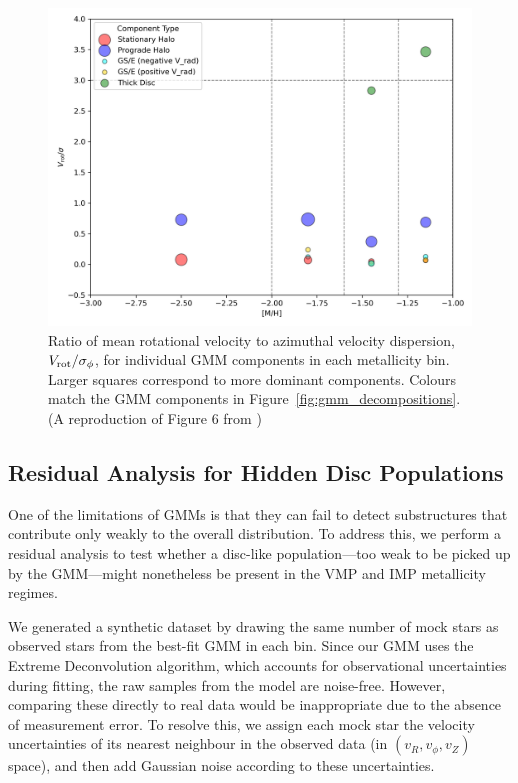 \documentclass[a4paper,12pt]{article}
\begin{document}
\begin{figure}[h]
    \centering
    \includegraphics[width=\linewidth]{../figures/v_over_sigma_per_component.png}
    \caption{Ratio of mean rotational velocity to azimuthal velocity dispersion, 
    $V_{\rm rot} / \sigma_\phi$, for individual GMM components in each metallicity bin. 
    Larger squares correspond to more dominant components. Colours match the GMM components 
    in Figure~\ref{fig:gmm_decompositions}.(A reproduction of Figure 6 from \citet{zhang2024existencemetalpoordiscmilky})}
    \label{fig:v_over_sigma}
\end{figure}

\subsection{Residual Analysis for Hidden Disc Populations}

One of the limitations of GMMs is that they can fail to detect substructures that contribute 
only weakly to the overall distribution. To address this, we perform a residual analysis to test 
whether a disc-like population—too weak to be picked up by the GMM—might nonetheless be present 
in the VMP and IMP metallicity regimes.

We generated a synthetic dataset by drawing the same number of mock stars as observed stars from 
the best-fit GMM in each bin. Since our GMM uses the Extreme Deconvolution algorithm, which accounts 
for observational uncertainties during fitting, the raw samples from the model are noise-free. 
However, comparing these directly to real data would be inappropriate due to the absence of measurement 
error. To resolve this, we assign each mock star the velocity uncertainties of its nearest neighbour 
in the observed data (in $(v_R, v_\phi, v_Z)$ space), and then add Gaussian noise according to 
these uncertainties.
\end{document}
